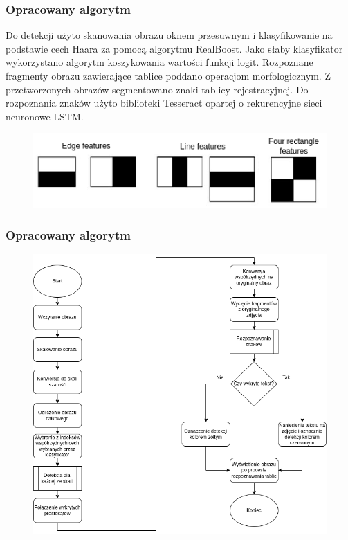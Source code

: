 \documentclass{beamer}
\begin{document}
    \begin{frame}
        \frametitle{Opracowany algorytm}
        Do detekcji użyto skanowania obrazu oknem przesuwnym i klasyfikowanie na podstawie cech Haara za pomocą algorytmu RealBoost.
        Jako słaby klasyfikator wykorzystano algorytm koszykowania wartości funkcji logit.
        Rozpoznane fragmenty obrazu zawierające tablice poddano operacjom morfologicznym.
        Z przetworzonych obrazów segmentowano znaki tablicy rejestracyjnej.
        Do rozpoznania znaków użyto biblioteki Tesseract opartej o rekurencyjne sieci neuronowe LSTM\@.
        \begin{figure}
            \includegraphics[scale=0.3]{../WIZUT-Dyplom-styl/Pictures/haar_feats}
        \end{figure}
    \end{frame}

    \begin{frame}
        \frametitle{Opracowany algorytm}
        \begin{figure}
            \includegraphics[scale=0.25]{../WIZUT-Dyplom-styl/Pictures/main_alg_scaled}
        \end{figure}
    \end{frame}
\end{document}

